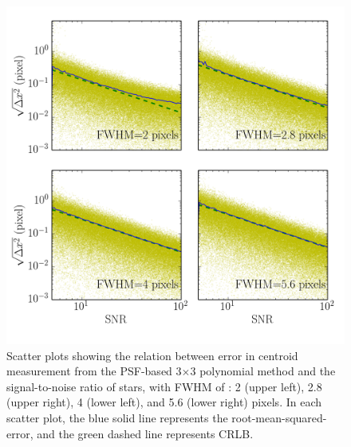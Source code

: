\documentclass[12pt, preprint]{aastex}
\begin{document}
\begin{figure}[!htb]
  \includegraphics[width=\linewidth]{snr_psfpoly.png}
\endminipage
\caption{Scatter plots showing the relation between error in centroid
measurement from the PSF-based 3$\times$3 polynomial method and the signal-to-noise
ratio of stars, with FWHM of : 2 (upper left), 2.8 (upper right), 4 (lower left),
and 5.6 (lower right) pixels. In each scatter plot, the blue solid line represents the root-mean-squared-error, and the green dashed line represents CRLB.}\label{2}
\end{figure}
\end{document}
